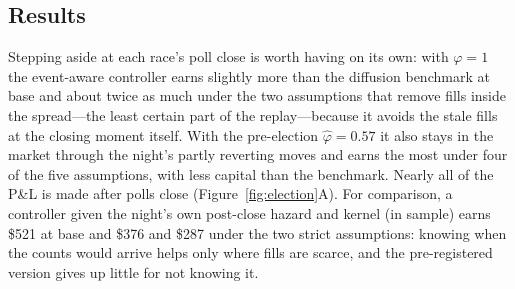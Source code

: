 \documentclass[11pt]{article}
\newcommand{\1}{\mathbf 1}
\begin{document}
\subsection{Results}
\begin{table}[htbp]
\centering\small
{}
\caption{2024 election, 40 races, November 2 to November 6 noon ET, net dollars after
flattening, under five fill assumptions: a trade through our quote fills us in full
when it also trades through the market's quote and a quarter when only through our
improved quote (base); only the former (beyond market); only trades at least 2 cents
through our price; a quarter of every fill; quotes from the candle two minutes old.
Peak capital is Kalshi collateral (resting orders and positions, netted per market).
The event-aware rows treat poll closings as the only scheduled events; every parameter is
fitted before the election.}
\label{tab:election}
\end{table}

Stepping aside at each race's poll close is worth having on its own: with
$\varphi=1$ the event-aware controller earns slightly more than the diffusion benchmark
at base and about twice as much under the two assumptions that remove fills inside
the spread---the least certain part of the replay---because it avoids the stale fills
at the closing moment itself. With the pre-election $\hat\varphi=0.57$ it also stays in
the market through the night's partly reverting moves and earns the most under four of
the five assumptions, with less capital than the benchmark. Nearly
all of the P\&L is made after polls close (Figure~\ref{fig:election}A). For comparison, a
controller given the night's own post-close hazard and kernel (in sample) earns
\$521 at base and \$376 and \$287 under the two strict assumptions: knowing when the
counts would arrive helps only where fills are scarce, and the pre-registered
version gives up little for not knowing it.
\end{document}
